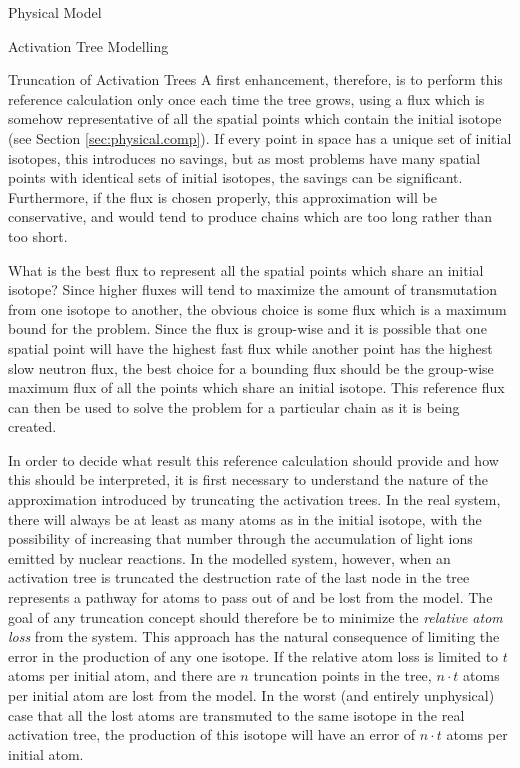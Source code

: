 \begin{chapter}{Physical Model\label{chap:physical}}
\begin{section}{Activation Tree Modelling\label{sec:physical.chains}}
\begin{subsection}{Truncation of Activation Trees}
    A first enhancement, therefore, is to perform this reference
    calculation only once each time the tree grows, using a flux which
    is somehow representative of all the spatial points which contain
    the initial isotope (see Section \ref{sec:physical.comp}). If
    every point in space has a unique set of initial isotopes, this
    introduces no savings, but as most problems have many spatial
    points with identical sets of initial isotopes, the savings can be
    significant.  Furthermore, if the flux is chosen properly, this
    approximation will be conservative, and would tend to produce
    chains which are too long rather than too short.
    
    What is the best flux to represent all the spatial points which
    share an initial isotope?  Since higher fluxes will tend to
    maximize the amount of transmutation from one isotope to another,
    the obvious choice is some flux which is a maximum bound for the
    problem.  Since the flux is group-wise and it is possible that one
    spatial point will have the highest fast flux while another point
    has the highest slow neutron flux, the best choice for a bounding
    flux should be the group-wise maximum flux of all the points which
    share an initial isotope.  This reference flux can then be used to
    solve the problem for a particular chain as it is being created.
    
    In order to decide what result this reference calculation should
    provide and how this should be interpreted, it is first necessary
    to understand the nature of the approximation introduced by
    truncating the activation trees.  In the real system, there will
    always be at least as many atoms as in the initial isotope, with
    the possibility of increasing that number through the accumulation
    of light ions emitted by nuclear reactions.  In the modelled
    system, however, when an activation tree is truncated the
    destruction rate of the last node in the tree represents a pathway
    for atoms to pass out of and be lost from the model.  The goal of
    any truncation concept should therefore be to minimize the
    \textsl{relative atom loss} from the system.  This approach has
    the natural consequence of limiting the error in the production of
    any one isotope.  If the relative atom loss is limited to $t$
    atoms per initial atom, and there are $n$ truncation points in the
    tree, $n\cdot t$ atoms per initial atom are lost from the model.
    In the worst (and entirely unphysical) case that all the lost
    atoms are transmuted to the same isotope in the real activation
    tree, the production of this isotope will have an error of $n
    \cdot t$ atoms per initial atom.
    

\end{subsection}
\end{section}
\end{chapter}
